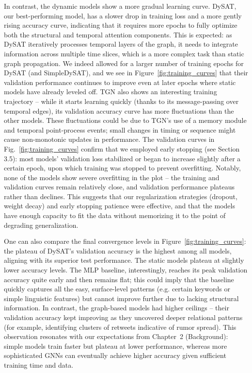 \documentclass{cshonours}
\begin{document}
In contrast, the dynamic models show a more gradual learning curve. DySAT, our best-performing model, has a slower drop in training loss and a more gently rising accuracy curve, indicating that it requires more epochs to fully optimize both the structural and temporal attention components. This is expected: as DySAT iteratively processes temporal layers of the graph, it needs to integrate information across multiple time slices, which is a more complex task than static graph propagation. We indeed allowed for a larger number of training epochs for DySAT (and SimpleDySAT), and we see in Figure~\ref{fig:training_curves} that their validation performance continues to improve even at later epochs where static models have already leveled off. TGN also shows an interesting training trajectory – while it starts learning quickly (thanks to its message-passing over temporal edges), its validation accuracy curve has more fluctuations than the other models. These fluctuations could be due to TGN's use of a memory module and temporal point-process events; small changes in timing or sequence might cause non-monotonic updates in performance. The validation curves in Fig.~\ref{fig:training_curves} confirm that we employed early stopping (see Section 3.5): most models' validation loss stabilized or began to increase slightly after a certain epoch, upon which training was stopped to prevent overfitting. Notably, none of the models show severe overfitting in the plot – the training and validation curves remain relatively close, and validation performance plateaus rather than declines. This suggests that our regularization strategies (dropout, weight decay) and early stopping patience were effective, and that the models have enough capacity to fit the data without memorizing it to the point of degrading generalization.

One can also compare the final convergence levels in Figure~\ref{fig:training_curves}: the plateau of DySAT's validation accuracy is the highest among all models, aligning with its superior test performance. The static models plateau at slightly lower accuracy levels. The MLP baseline, interestingly, reaches its peak validation accuracy quite early and then remains flat; this could imply that the baseline quickly captures all the easy, surface-level patterns (e.g. certain keywords or simple linguistic features) but cannot improve further due to lacking structural information. In contrast, the graph-based models had higher ceilings – their validation accuracy kept improving as they uncovered deeper relational patterns (for example, identifying clusters of retweets indicative of rumor spread). This observation resonates with our expectations from Chapter~2 (Background): simple models train faster but plateau at lower performance, whereas more sophisticated GNNs can eventually achieve higher accuracy given sufficient training time and data.
\end{document}
